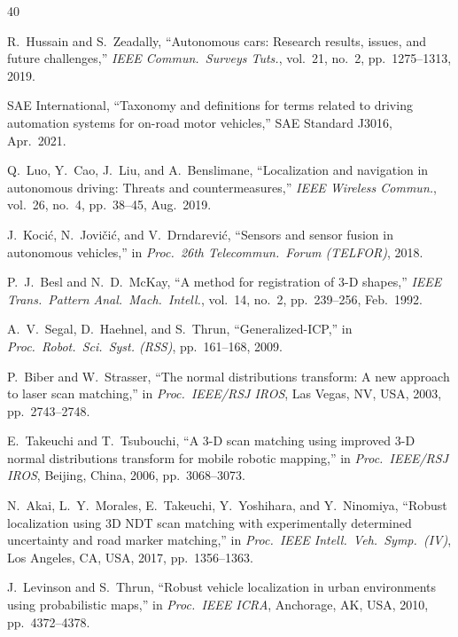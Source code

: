 \documentclass[lettersize,journal]{IEEEtran}
\begin{document}
\begin{thebibliography}{40}

R.~Hussain and S.~Zeadally,
``Autonomous cars: Research results, issues, and future challenges,''
\textit{IEEE Commun.\ Surveys Tuts.}, vol.~21, no.~2, pp.~1275--1313, 2019.

{SAE International},
``Taxonomy and definitions for terms related to driving automation systems
for on-road motor vehicles,'' SAE Standard J3016, Apr.\ 2021.

Q.~Luo, Y.~Cao, J.~Liu, and A.~Benslimane,
``Localization and navigation in autonomous driving: Threats and
countermeasures,''
\textit{IEEE Wireless Commun.}, vol.~26, no.~4, pp.~38--45, Aug.\ 2019.

J.~Koci\'{c}, N.~Jovi\v{c}i\'{c}, and V.~Drndarevi\'{c},
``Sensors and sensor fusion in autonomous vehicles,''
in \textit{Proc.\ 26th Telecommun.\ Forum (TELFOR)}, 2018.

P.~J.~Besl and N.~D.~McKay,
``A method for registration of 3-D shapes,''
\textit{IEEE Trans.\ Pattern Anal.\ Mach.\ Intell.}, vol.~14, no.~2,
pp.~239--256, Feb.\ 1992.

A.~V.~Segal, D.~Haehnel, and S.~Thrun,
``Generalized-{ICP},''
in \textit{Proc.\ Robot.\ Sci.\ Syst. (RSS)}, pp.~161--168, 2009.

P.~Biber and W.~Strasser,
``The normal distributions transform: A new approach to laser scan matching,''
in \textit{Proc.\ IEEE/RSJ IROS}, Las Vegas, NV, USA, 2003,
pp.~2743--2748.

E.~Takeuchi and T.~Tsubouchi,
``A 3-D scan matching using improved 3-D normal distributions transform
for mobile robotic mapping,''
in \textit{Proc.\ IEEE/RSJ IROS}, Beijing, China, 2006, pp.~3068--3073.

N.~Akai, L.~Y.~Morales, E.~Takeuchi, Y.~Yoshihara, and Y.~Ninomiya,
``Robust localization using 3D NDT scan matching with experimentally
determined uncertainty and road marker matching,''
in \textit{Proc.\ IEEE Intell.\ Veh.\ Symp.\ (IV)}, Los Angeles, CA,
USA, 2017, pp.~1356--1363.

J.~Levinson and S.~Thrun,
``Robust vehicle localization in urban environments using probabilistic
maps,''
in \textit{Proc.\ IEEE ICRA}, Anchorage, AK, USA, 2010, pp.~4372--4378.


\end{thebibliography}
\end{document}
